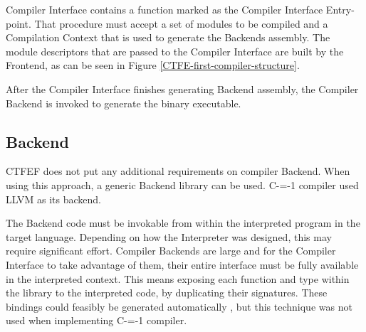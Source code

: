 Compiler Interface contains a function marked as the Compiler Interface Entry-point.
That procedure must accept a set of modules to be compiled and a Compilation Context that is used to generate the Backends assembly.
The module descriptors that are passed to the Compiler Interface are built by the Frontend, as can be seen in Figure \ref{CTFE-first-compiler-structure}.

After the Compiler Interface finishes generating Backend assembly, the Compiler Backend is invoked to generate the binary executable.
\subsection{Backend}
\label{Backend}

CTFEF does not put any additional requirements on compiler Backend.
When using this approach, a generic Backend library can be used.
C-=-1 compiler used LLVM\cite{lattner2008llvm} as its backend.

The Backend code must be invokable from within the interpreted program in the target language.
Depending on how the Interpreter was designed, this may require significant effort. %
Compiler Backends are large and for the Compiler Interface to take advantage of them, their entire interface must be fully available in the interpreted context.
This means exposing each function and type within the library to the interpreted code, by duplicating their signatures.
These bindings could feasibly be generated automatically \cite{marshalling_auto_generation}, but this technique was not used when implementing C-=-1 compiler.
